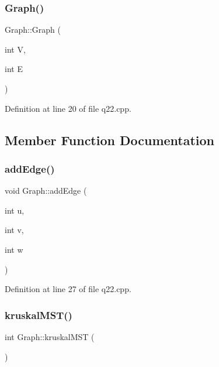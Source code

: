 \subsubsection{\texorpdfstring{Graph()}{Graph()}}
{\footnotesize\ttfamily Graph\+::\+Graph (\begin{DoxyParamCaption}\item[{int}]{V,  }\item[{int}]{E }\end{DoxyParamCaption})\hspace{0.3cm}{\ttfamily [inline]}}



Definition at line 20 of file q22.\+cpp.



\subsection{Member Function Documentation}
\mbox{\label{struct_graph_ab7b4b061fdba1d19a5fbcee110a319bd}} 
\subsubsection{\texorpdfstring{add\+Edge()}{addEdge()}}
{\footnotesize\ttfamily void Graph\+::add\+Edge (\begin{DoxyParamCaption}\item[{int}]{u,  }\item[{int}]{v,  }\item[{int}]{w }\end{DoxyParamCaption})\hspace{0.3cm}{\ttfamily [inline]}}



Definition at line 27 of file q22.\+cpp.

\mbox{\label{struct_graph_acec80ad3aef831280f7a05217270fb7b}} 
\subsubsection{\texorpdfstring{kruskal\+M\+S\+T()}{kruskalMST()}}
{\footnotesize\ttfamily int Graph\+::kruskal\+M\+ST (\begin{DoxyParamCaption}{ }\end{DoxyParamCaption})}



